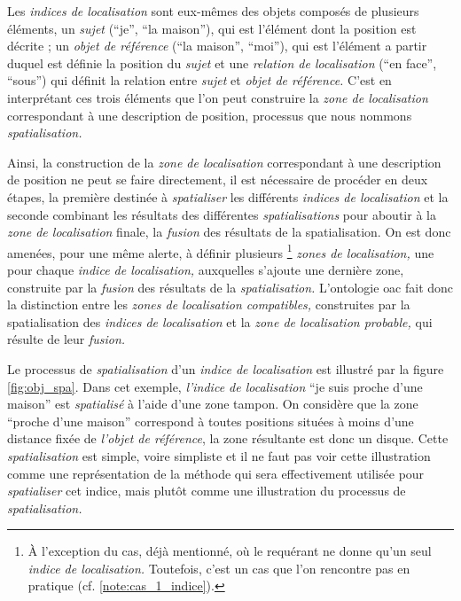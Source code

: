 Les \emph{indices de localisation} sont eux-mêmes des objets composés
de plusieurs éléments, un \emph{sujet} (\enquote{je}, \enquote{la
  maison}), qui est l'élément dont la position est décrite ; un
\emph{objet de référence} (\enquote{la maison}, \enquote{moi}), qui
est l'élément a partir duquel est définie la position du \emph{sujet}
et une \emph{relation de localisation} (\enquote{en face},
\enquote{sous}) qui définit la relation entre \emph{sujet} et
\emph{objet de référence.} C'est en interprétant ces trois éléments
que l'on peut construire la \emph{zone de localisation} correspondant
à une description de position, processus que nous nommons
\emph{spatialisation.}

Ainsi, la construction de la \emph{zone de localisation} correspondant
à une description de position ne peut se faire directement, il est
nécessaire de procéder en deux étapes, la première destinée à
\emph{spatialiser} les différents \emph{indices de localisation} et la
seconde combinant les résultats des différentes \emph{spatialisations}
pour aboutir à la \emph{zone de localisation} finale, \ie la
\emph{fusion} des résultats de la spatialisation. On est donc amenées,
pour une même alerte, à définir plusieurs \footnote{À l'exception du
  cas, déjà mentionné, où le requérant ne donne qu'un seul
  \emph{indice de localisation.}  Toutefois, c'est un cas que l'on
  rencontre pas en pratique (cf. \autoref{note:cas_1_indice}).}
\emph{zones de localisation,} une pour chaque \emph{indice de
  localisation,} auxquelles s'ajoute une dernière zone, construite par
la \emph{fusion} des résultats de la \emph{spatialisation.}
L'ontologie \ac{oac} \autocite{Viry2019} fait donc la distinction
entre les \emph{zones de localisation compatibles,} construites par la
spatialisation des \emph{indices de localisation} et la \emph{zone de
  localisation probable,} qui résulte de leur \emph{fusion.}

Le processus de \emph{spatialisation} d'un \emph{indice de
  localisation} est illustré par la figure \ref{fig:obj_spa}. Dans cet
exemple, \emph{l'indice de localisation} \enquote{je suis proche d'une
  maison} est \emph{spatialisé} à l'aide d'une zone tampon. On
considère que la zone \enquote{proche d'une maison} correspond à
toutes positions situées à moins d'une distance fixée de \emph{l'objet
  de référence}, la zone résultante est donc un disque. Cette
\emph{spatialisation} est simple, voire simpliste et il ne faut pas
voir cette illustration comme une représentation de la méthode qui
sera effectivement utilisée pour \emph{spatialiser} cet indice, mais
plutôt comme une illustration du processus de \emph{spatialisation.}

